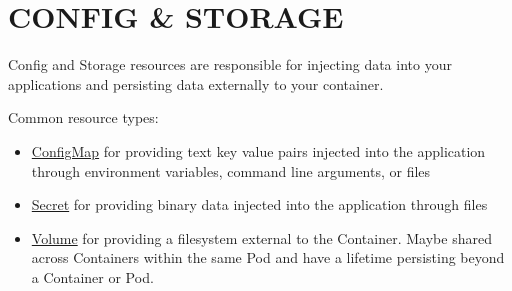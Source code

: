 \section{CONFIG \& STORAGE}

Config and Storage resources are responsible for injecting data into your
applications and persisting data externally to your container.

Common resource types:

\begin{itemize}
  \item \href{#configmap-v1-core}{ConfigMap} for providing text key value pairs
        injected into the application through environment variables, command line arguments, or files
  \item \href{#secret-v1-core}{Secret} for providing binary data injected into the application through files
  \item \href{#volume-v1-core}{Volume} for providing a filesystem external to the Container.
        Maybe shared across Containers within the same Pod and have a lifetime
        persisting beyond a Container or Pod.
\end{itemize}

